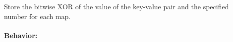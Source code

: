 Store the bitwise XOR of the value of the key-value pair and the specified
number for each map.

\paragraph{Behavior:}
\begin{itemize}[noitemsep]


\end{itemize}

